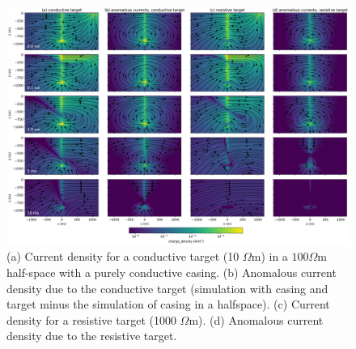 \begin{figure}[!htb]
    \begin{center}
    \includegraphics[width=1\textwidth]{figures/tdem-currents-cross-section-target.png}
    \end{center}
\caption{
    (a) Current density for a conductive target (10 $\Omega$m) in a $100 \Omega$m half-space with a purely conductive casing.
    (b) Anomalous current density due to the conductive target (simulation with casing and target minus the simulation of casing in a halfspace).
    (c) Current density for a resistive target (1000 $\Omega$m).
    (d) Anomalous current density due to the resistive target.
}
\label{fig:tdem-currents-cross-section-target}
\end{figure}
